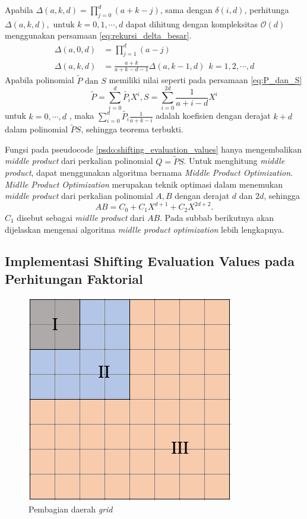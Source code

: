 Apabila  $ \Delta (a,k,d) = \prod_{j=0}^d (a+k-j) $, sama dengan $ \delta(i,d) $, perhitunga $ \Delta(a,k,d), \text{ untuk }k = 0, 1, \cdots, d $ dapat dihitung dengan kompleksitas $ \mathcal{O}{(d)} $ menggunakan persamaan \eqref{eq:rekursi_delta_besar}.
\begin{equation}
	\begin{aligned}
		\Delta (a,0,d) &= \prod_{j=1}^d(a-j) \\
		\Delta(a,k,d) &= \frac{a+k}{a+k - d - 1} \Delta(a,k-1,d)\ \ k = 1, 2, \cdots, d
	\end{aligned}
	\label{eq:rekursi_delta_besar}
\end{equation}
Apabila polinomial $ \tilde{P} \text{ dan } S $ memiliki nilai seperti pada persamaan \eqref{eq:P_dan_S}
\begin{equation}
	\tilde{P} = \sum_{i=0}^d \tilde{P_i} X^i , S = \sum_{i=0}^{2d} \frac{1}{a+i-d} X^i
	\label{eq:P_dan_S}
\end{equation}
untuk $ k=0, \cdots, d$ , maka $ \sum_{i=0}^d \tilde{P_i} \frac{1}{a+k-i} $ adalah koefisien dengan derajat $ k+d $ dalam polinomial $ \tilde{P}S $, sehingga teorema terbukti.

Fungsi pada pseudocode \ref{psdo:shifting_evaluation_values} hanya mengembalikan \textit{middle product} dari perkalian polinomial $ Q = \tilde{P}S $. Untuk menghitung \textit{middle product}, dapat menggunakan algoritma bernama \textit{Middle Product Optimization}.\textit{ Midlle Product Optimization} merupakan teknik optimasi dalam menemukan \textit{middle product} dari perkalian polinomial $ A , B $ dengan derajat $ d $ dan $ 2d $, sehingga $$ AB = C_0 + C_1X^{d+1} + C_2X^{2d+2}. $$ $ C_1 $ disebut sebagai \textit{midlle product} dari $ AB $. Pada subbab berikutnya akan dijelaskan mengenai algoritma \textit{midlle product optimization} lebih lengkapnya. 

\subsection{ Implementasi Shifting Evaluation Values pada Perhitungan Faktorial}

\begin{figure}
	\Centering
	\includegraphics [scale=0.6]{bab2/img/kotak-pembagian-daerah}
	\caption {Pembagian daerah \textit{\textit{grid}}}
	\label {fig:kotak-pembagian-daerah}
\end{figure}

